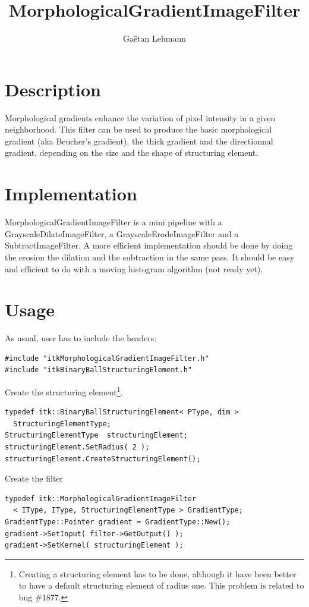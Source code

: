 \documentclass[IJ]{cesj}
\author{Ga\"etan Lehmann}
\institute{Biologie du d\'eveloppement et de la reproduction, INRA de Jouy-en-Josas}
\title{MorphologicalGradientImageFilter}
\begin{document}
\lstset{language=c++}
\maketitle

\section{Description}
Morphological gradients enhance the variation of pixel intensity in a given neighborhood. This filter can be used to produce the basic morphological gradient (aka Beucher's gradient), the thick gradient and the directionnal gradient, depending on the size and the shape of structuring element.

\section{Implementation}
MorphologicalGradientImageFilter is a mini pipeline with a GrayscaleDilateImageFilter, a GrayscaleErodeImageFilter and a SubtractImageFilter. A more efficient implementation should be done by doing the erosion the dilation and the subtraction in the same pass. It should be easy and efficient to do with a moving histogram algorithm (not ready yet).

\section{Usage}
As usual, user has to include the headers:
\begin{lstlisting}
#include "itkMorphologicalGradientImageFilter.h"
#include "itkBinaryBallStructuringElement.h"
\end{lstlisting}
Create the structuring element\footnote{Creating a structuring element has to be done, although it have been better to have a default structuring element of radius one. This problem is related to bug \#1877.}.
\begin{lstlisting}
typedef itk::BinaryBallStructuringElement< PType, dim >
  StructuringElementType;
StructuringElementType  structuringElement;
structuringElement.SetRadius( 2 );
structuringElement.CreateStructuringElement();
\end{lstlisting}
Create the filter
\begin{lstlisting}
typedef itk::MorphologicalGradientImageFilter
  < IType, IType, StructuringElementType > GradientType;
GradientType::Pointer gradient = GradientType::New();
gradient->SetInput( filter->GetOutput() );
gradient->SetKernel( structuringElement );
\end{lstlisting}
\end{document}
